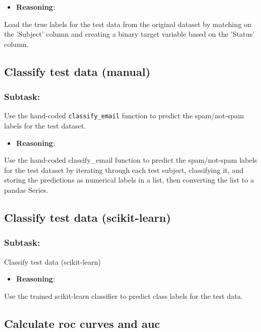 \documentclass[12pt,a4paper]{article}
\begin{document}
\begin{itemize}
    \item \textbf{Reasoning}:
\end{itemize}

Load the true labels for the test data from the original dataset by matching on the 'Subject' column and creating a binary target variable based on the 'Status' column.



\subsection{Classify test data (manual)}

\subsubsection{Subtask:}
Use the hand-coded \texttt{classify\_email} function to predict the spam/not-spam labels for the test dataset.


\begin{itemize}
    \item \textbf{Reasoning}:
\end{itemize}

Use the hand-coded classify\_email function to predict the spam/not-spam labels for the test dataset by iterating through each test subject, classifying it, and storing the predictions as numerical labels in a list, then converting the list to a pandas Series.



\subsection{Classify test data (scikit-learn)}

\subsubsection{Subtask:}
Classify test data (scikit-learn)


\begin{itemize}
    \item \textbf{Reasoning}:
\end{itemize}

Use the trained scikit-learn classifier to predict class labels for the test data.



\subsection{Calculate roc curves and auc}
\end{document}
